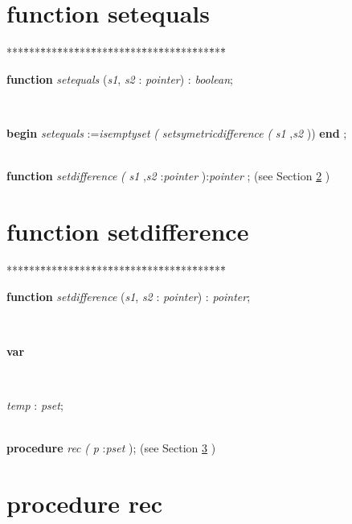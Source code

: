 \documentclass[10pt, a4paper]{article}
\begin{document}
\section{function setequals}\label{sec:genericset/pointer2pset/setle/setgesetequals}

\begin{tabbing}
***\=***\=***\=***\=***\=***\=***\=***\=***\=***\=***\=***\=***\=\kill
\parbox{14cm}{\textsf {\textbf {function } \textsf{\textit{setequals} (\textit{s1}, \textit{s2} : \textit{pointer}) : \textit{boolean}}; }}\\
\parbox{14cm}{\textsf{\textbf{begin} 	\textit{setequals} :=\textit{isemptyset} \textit{(} \textit{setsymetricdifference} \textit{(} \textit{s1} ,\textit{s2} )) \textbf{end} ;}}\\
\+\textsf{\textbf{function}  \textit{setdifference} \textit{(} \textit{s1} ,\textit{s2} :\textit{pointer} ):\textit{pointer} ;} (see Section \ref{sec:genericset/pointer2pset/setle/setge/setequalssetdifference} )\\
\end{tabbing}
\section{function setdifference}\label{sec:genericset/pointer2pset/setle/setge/setequalssetdifference}

\begin{tabbing}
***\=***\=***\=***\=***\=***\=***\=***\=***\=***\=***\=***\=***\=\kill
\parbox{14cm}{\textsf {\textbf {function } \textsf{\textit{setdifference} (\textit{s1}, \textit{s2} : \textit{pointer}) : \textit{pointer}}; }}\\
\+\parbox{14cm}{\textsf{\textbf{var} }}\\
\parbox{14cm}{\textsf{\textit{temp} : \textit{pset}}; }\\
\<\textsf{\textbf{procedure}  \textit{rec} \textit{(} \textit{p} :\textit{pset} );} (see Section \ref{sec:genericset/pointer2pset/setle/setge/setequals/setdifferencerec} )\\
\end{tabbing}
\section{procedure rec}\label{sec:genericset/pointer2pset/setle/setge/setequals/setdifferencerec}
\end{document}
